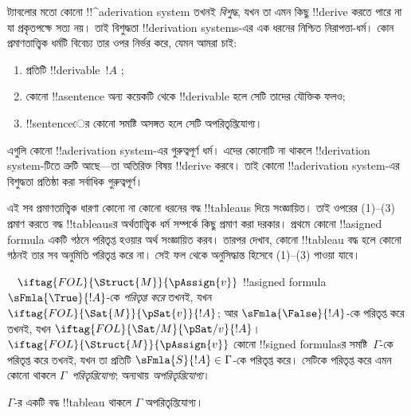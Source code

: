\documentclass[../../../include/open-logic-section]{subfiles}
\begin{document}
      {}
      {}


\begin{explain}
ট্যাবলোর মতো কোনো !!^a{derivation} system তখনই \emph{বিশুদ্ধ}, যখন
তা এমন কিছু !!{derive} করতে পারে না যা প্রকৃতপক্ষে সত্য নয়। তাই
বিশুদ্ধতা !!{derivation} systems-এর এক ধরনের নিশ্চিত নিরাপত্তা-ধর্ম।
কোন প্রমাণতাত্ত্বিক ধর্মটি বিবেচ্য তার ওপর নির্ভর করে, যেমন আমরা চাই:
\begin{enumerate}
\item প্রতিটি !!{derivable}~$!A$ ;
\item কোনো !!a{sentence} অন্য কয়েকটি থেকে !!{derivable} হলে সেটি
  তাদের যৌক্তিক ফলও;
\item !!{sentence}ের কোনো সমষ্টি অসঙ্গত হলে সেটি অপরিতৃপ্তিযোগ্য।
\end{enumerate}
এগুলি কোনো !!a{derivation} system-এর গুরুত্বপূর্ণ ধর্ম। এদের কোনোটি
না থাকলে !!{derivation} system-টিতে ত্রুটি আছে—তা অতিরিক্ত বিষয়
!!{derive} করবে। তাই কোনো !!a{derivation} system-এর বিশুদ্ধতা
প্রতিষ্ঠা করা সর্বাধিক গুরুত্বপূর্ণ।

এই সব প্রমাণতাত্ত্বিক ধারণা কোনো না কোনো ধরনের বদ্ধ !!{tableau}s
দিয়ে সংজ্ঞায়িত। তাই ওপরের (1)--(3) প্রমাণ করতে বদ্ধ !!{tableau}sর
অর্থতাত্ত্বিক ধর্ম সম্পর্কে কিছু প্রমাণ করা দরকার। প্রথমে কোনো
!!a{signed
  formula} একটি গঠনে পরিতৃপ্ত হওয়ার অর্থ সংজ্ঞায়িত করব।
তারপর দেখাব, কোনো !!{tableau} বদ্ধ হলে কোনো গঠনই তার সব অনুমিতি
পরিতৃপ্ত করে না। সেই ফল থেকে অনুসিদ্ধান্ত হিসেবে (1)--(3) পাওয়া যাবে।
\end{explain}

\begin{defn}
~
$\iftag{FOL}{\Struct{M}}{\pAssign{v}}$
!!a{signed formula}~$\sFmla{\True}{!A}$-কে \emph{পরিতৃপ্ত করে}
তখনই, যখন $\iftag{FOL}{\Sat{M}}{\pSat{v}}{!A}$; আর
$\sFmla{\False}{!A}$-কে পরিতৃপ্ত করে তখনই, যখন
$\iftag{FOL}{\Sat/{M}}{\pSat/{v}}{!A}$।
$\iftag{FOL}{\Struct{M}}{\pAssign{v}}$ কোনো
!!{signed formula}sর সমষ্টি~$\Gamma$-কে পরিতৃপ্ত করে তখনই, যখন
তা প্রতিটি $\sFmla{S}{!A} \in \Gamma$-কে পরিতৃপ্ত করে। সেটিকে
পরিতৃপ্ত করে এমন কোনো 
থাকলে $\Gamma$~\emph{পরিতৃপ্তিযোগ্য}; অন্যথায়
\emph{অপরিতৃপ্তিযোগ্য}।
\end{defn}

\begin{thm}[বিশুদ্ধতা]
  $\Gamma$-র একটি বদ্ধ !!{tableau} থাকলে $\Gamma$
  অপরিতৃপ্তিযোগ্য।
\end{thm}
\end{document}
